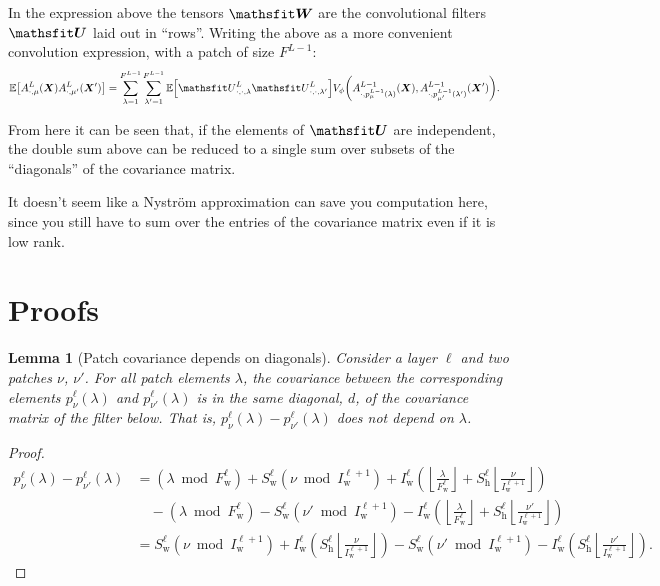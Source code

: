 \documentclass{article} %
\newcommand{\bracket}[3]{{\left#1 #3 \right#2}}
\newcommand{\bra}{\bracket{(}{)}}
\newcommand{\sqb}{\bracket{[}{]}}
\newcommand{\floor}{\bracket{\lfloor}{\rfloor}}
\newcommand{\ssup}[1]{^{#1}}
\newcommand{\patch}[2]{{p\ssup{#1}_{#2}}}
\newcommand{\p}[2]{{\patch{\ell #1}{\nu #2}\bra{\lambda}}}
\newcommand{\Iw}[1]{{I\ssup{#1}_\text{w}}}
\newcommand{\Iwl}[1]{\Iw{\ell #1}}
\newcommand{\Sw}[1]{{S\ssup{#1}_\text{w}}}
\newcommand{\Swl}[1]{\Sw{\ell #1}}
\newcommand{\Sh}[1]{{S\ssup{#1}_\text{h}}}
\newcommand{\Shl}[1]{\Sh{\ell #1}}
\newcommand{\Fw}[1]{{F\ssup{#1}_\text{w}}}
\newcommand{\Fwl}[1]{\Fw{\ell #1}}
\newtheorem{lemma}[theorem]{Lemma}
\begin{document}
In the expression above the tensors $\tW$ are the convolutional filters $\tU$ laid out in ``rows''. Writing the above as a more convenient convolution expression, with a patch of size $F^{L-1}$:
\begin{align}
\E\sqb{\emA_{\cdot,\mu}\ssup{L}(\mX)\emA_{\cdot,\mu'}\ssup{L}(\mX')} &=
\sum_{\lambda=1}^{F^{L-1}} \sum_{\lambda'=1}^{F^{L-1}}
\E\sqb{\etU\ssup{L}_{\cdot,\cdot,\lambda}\etU\ssup{L}_{\cdot,\cdot,\lambda'}}
V_\phi\bra{\emA\ssup{L-1}_{\cdot,p_{\mu}^{L-1}(\lambda)}(\mX), \emA\ssup{L-1}_{\cdot,p_{\mu'}^{L-1}(\lambda')}(\mX')}.
\end{align}

From here it can be seen that, if the elements of $\tU$ are independent, the double sum above can be reduced to a single sum over subsets of the ``diagonals'' of the covariance matrix.

It doesn't seem like a Nyström approximation can save you computation here, since you still have to sum over the entries of the covariance matrix even if it is low rank.
\appendix

\section{Proofs}

\begin{lemma}[Patch covariance depends on diagonals]
  Consider a layer $\ell$ and two patches $\nu$, $\nu'$. For all patch elements $\lambda$, the covariance between the corresponding elements
  $\p{}{}$ and $\p{}{'}$ is in the same diagonal,
  $d$, of the covariance matrix of the filter below. That is,
  $\p{}{} - \p{}{'}$ does not depend on $\lambda$.
  \label{lemma:patches-are-diagonal}
\end{lemma}
\begin{proof}
\begin{align*}
\p{}{}{} - \p{}{'}{}
  &= \bra{\lambda \bmod \Fwl{}} + \Swl{}\bra{\nu\bmod \Iwl{+1}}
  + \Iwl{}\bra{\floor{\frac{\lambda}{\Fwl{}}} + \Shl{} \floor{\frac{\nu}{\Iwl{+1}}}} \\
  &\hspace{1em}- \bra{\lambda \bmod \Fwl{}} - \Swl{}\bra{\nu'\bmod \Iwl{+1}}
    - \Iwl{}\bra{\floor{\frac{\lambda}{\Fwl{}}} + \Shl{} \floor{\frac{\nu'}{\Iwl{+1}}}} \\
  &=\Swl{}\bra{\nu\bmod \Iwl{+1}} +
    \Iwl{}\bra{\Shl{} \floor{\frac{\nu}{\Iwl{+1}}}}
    -\Swl{}\bra{\nu'\bmod \Iwl{+1}} -
    \Iwl{}\bra{\Shl{} \floor{\frac{\nu'}{\Iwl{+1}}}}.
\end{align*}
\end{proof}
\end{document}

